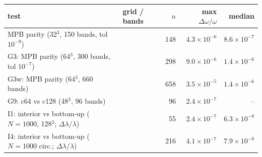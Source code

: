 \begin{tabular}{@{}llrrr@{}}
\hline\hline
 test & grid / bands & $n$ & max $\Delta\omega/\omega$ & median \\
\hline
 MPB parity (32$^3$, 150 bands, tol $10^{-9}$) & & 148 & $4.3\times10^{-6}$ & $8.6\times10^{-7}$ \\
 G3: MPB parity (64$^3$, 300 bands, tol $10^{-7}$) & & 298 & $9.0\times10^{-6}$ & $1.4\times10^{-6}$ \\
 G3w: MPB parity (64$^3$, 660 bands) & & 658 & $3.5\times10^{-5}$ & $1.4\times10^{-6}$ \\
 G9: c64 vs c128 (48$^3$, 96 bands) & & 96 & $2.4\times10^{-7}$ & -- \\
 I1: interior vs bottom-up ($N=1000$, 128$^3$; $\Delta\lambda/\lambda$) & & 55 & $2.4\times10^{-7}$ & $6.3\times10^{-8}$ \\
 I4: interior vs bottom-up ($N=1000$ circ.; $\Delta\lambda/\lambda$) & & 216 & $4.1\times10^{-7}$ & $7.9\times10^{-8}$ \\
\hline\hline
\end{tabular}
